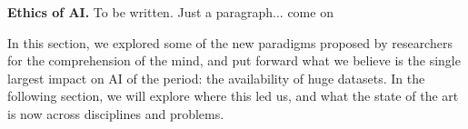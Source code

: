 \documentclass[../main.tex]{subfiles}
\begin{document}
\textbf{Ethics of AI.} To be written. Just a paragraph... come on


\vspace{5pt}
In this section, we explored some of the new paradigms proposed by researchers for the comprehension of the mind, and put forward what we believe is the single largest impact on AI of the period: the availability of huge datasets. In the following section, we will explore where this led us, and what the state of the art is now across disciplines and problems.
\end{document}
